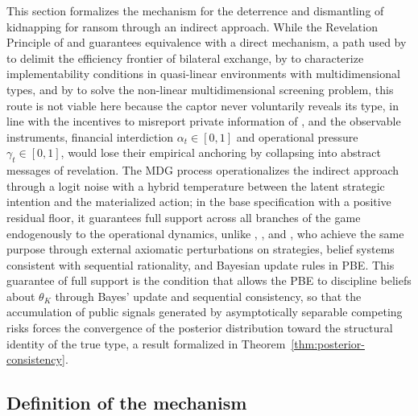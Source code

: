 \documentclass[ecta,nameyear,draft]{econsocart}
\theoremstyle{plain}
\theoremstyle{definition}
\newcommand{\1}{\mathbf{1}}
\begin{document}
This section formalizes the mechanism for the deterrence and dismantling of kidnapping for ransom through an indirect approach. While the Revelation Principle of \citet{Gibbard1973} and \citet{Myerson1979IC,Myerson1981} guarantees equivalence with a direct mechanism, a path used by \citet{MyersonSatterthwaite1983} to delimit the efficiency frontier of bilateral exchange, by \citet{Rochet1987} to characterize implementability conditions in quasi-linear environments with multidimensional types, and by \citet{RochetChone1998} to solve the non-linear multidimensional screening problem, this route is not viable here because the captor never voluntarily reveals its type, in line with the incentives to misreport private information of \citet{Fearon1995Rationalist}, and the observable instruments, financial interdiction $\alpha_t\in[0,1]$ and operational pressure $\gamma_t\in[0,1]$, would lose their empirical anchoring by collapsing into abstract messages of revelation. The MDG process operationalizes the indirect approach through a logit noise with a hybrid temperature between the latent strategic intention and the materialized action; in the base specification with a positive residual floor, it guarantees full support across all branches of the game endogenously to the operational dynamics, unlike \citet{Selten1975Perfectness}, \citet{KrepsWilson1982}, and \citet{FudenbergTirole1991}, who achieve the same purpose through external axiomatic perturbations on strategies, belief systems consistent with sequential rationality, and Bayesian update rules in PBE. This guarantee of full support is the condition that allows the PBE to discipline beliefs about $\theta_K$ through Bayes' update and sequential consistency, so that the accumulation of public signals generated by asymptotically separable competing risks forces the convergence of the posterior distribution toward the structural identity of the true type, a result formalized in Theorem~\ref{thm:posterior-consistency}.

\subsection{Definition of the mechanism}\label{subsec:def-mecanismo}
\end{document}
